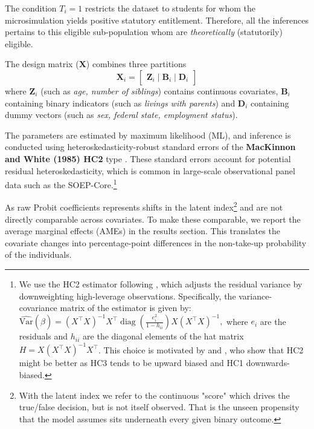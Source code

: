 The condition \( T_{i} = 1 \) restricts the dataset to students for whom the microsimulation yields positive statutory entitlement. Therefore, all the inferences pertains to this eligible sub-population whom are \textit{theoretically} (statutorily) eligible. 

The design matrix (\( \mathbf{X} \)) combines three partitions 
\begin{equation}
  \mathbf{X}_{i} = 
  \begin{bmatrix}
    \mathbf{Z}_{i} \mid \mathbf{B}_{i} \mid \mathbf{D}_{i}
  \end{bmatrix}
\end{equation}
where \( \mathbf{Z}_{i} \) (such as \textit{age, number of siblings}) contains continuous covariates, \( \mathbf{B}_{i} \) containing binary indicators (such as \textit{livings with parents})  and \( \mathbf{D}_{i} \) containing dummy vectors (such as \textit{sex, federal state, employment status}). 

The parameters are estimated by maximum likelihood (ML), and inference is conducted using heteroskedasticity-robust standard errors of the \textbf{MacKinnon and White (1985) HC2} type \citep{mackinnon_heteroskedasticity-consistent_1985}. These standard errors account for potential residual heteroskedasticity, which is common in large-scale observational panel data such as the SOEP-Core.\footnote{
We use the HC2 estimator following \citet{mackinnon_heteroskedasticity-consistent_1985}, which adjusts the residual variance by downweighting high-leverage observations. Specifically, the variance-covariance matrix of the estimator is given by:
\(
\widehat{\mathrm{Var}}(\hat{\beta}) = (X^\top X)^{-1} X^\top \operatorname{diag}\left( \frac{e_i^2}{1 - h_{ii}} \right) X (X^\top X)^{-1},
\)
where \( e_i \) are the residuals and \( h_{ii} \) are the diagonal elements of the hat matrix \( H = X(X^\top X)^{-1}X^\top \). This choice is motivated by \citet{chesher_hajek_1989} and \citet[Section 4]{chesher_finite-sample_1991}, who show that HC2 might be better as HC3 tends to be upward biased and HC1 downwards-biased.
}

As raw Probit coefficients represents shifts in the latent index\footnote{
With the latent index we refer to the continuous "score" which drives the true/false decision, but is not itself observed. That is the unseen propensity that the model assumes sits underneath every given binary outcome.
}
and are not directly comparable across covariates. To make these comparable, we report the average marginal effects (AMEs) in the results section. This translates the covariate changes into percentage-point differences in the non-take-up probability of the individuals.


